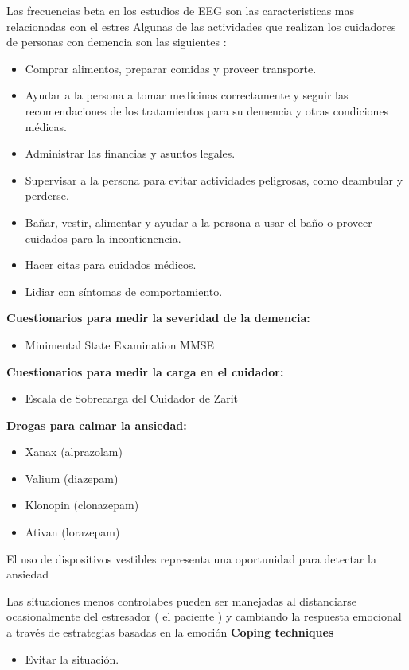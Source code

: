 \documentclass[letterpaper,12pt]{cicese}
\begin{document}
		Las frecuencias beta en los estudios de EEG son las caracteristicas mas relacionadas con el estres \citep{Sharma20121287}
		Algunas de las actividades que realizan los cuidadores de personas con demencia son las siguientes \citep{tagkey2008110}: 
		\begin{itemize}
			\item Comprar alimentos, preparar comidas y proveer transporte.
			\item Ayudar a la persona a tomar medicinas correctamente y seguir las recomendaciones de los tratamientos para su demencia y otras condiciones m\'edicas.
			\item Administrar las financias y asuntos legales.
			\item Supervisar a la persona para evitar actividades peligrosas, como deambular y perderse.	
			\item Ba\~nar, vestir, alimentar y ayudar a la persona a usar el ba\~no o proveer cuidados para la incontienencia.
			\item Hacer citas para cuidados m\'edicos.
			\item Lidiar con s\'intomas de comportamiento.

		\end{itemize}
		\textbf{Cuestionarios para medir la severidad de la demencia:}
		\begin{itemize}

			\item Minimental State Examination MMSE

		\end{itemize}
		\textbf{Cuestionarios para medir la carga en el cuidador:}
		\begin{itemize}

			\item Escala de Sobrecarga del Cuidador de Zarit

		\end{itemize}
		\textbf{Drogas para calmar la ansiedad:}
		\begin{itemize}
			\item Xanax (alprazolam)
			\item Valium (diazepam)
			\item Klonopin (clonazepam)
			\item Ativan (lorazepam)
		\end{itemize}

	El uso de dispositivos vestibles representa una oportunidad para detectar la ansiedad \citep{Miranda:2014:ADU:2676690.2676694}
	
	Las situaciones menos controlabes pueden ser manejadas al distanciarse ocasionalmente del estresador ( el paciente )  y cambiando la respuesta emocional a trav\'es de estrategias basadas en la emoci\'on
	\textbf{Coping techniques}
	\begin{itemize}
		\item Evitar la situaci\'on.
	\end{itemize}
        {\normalsize
		
                
        }


	
\end{document}
